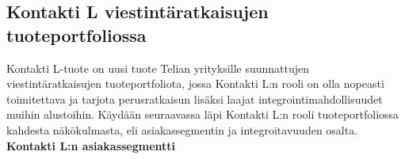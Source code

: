 \documentclass[finnish,12pt,a4paper,pdftex]{article}
\begin{document}






\subsection{Kontakti L viestintäratkaisujen tuoteportfoliossa}

Kontakti L-tuote on uusi tuote Telian yrityksille suunnattujen viestintäratkaisujen tuoteportfoliota, jossa Kontakti L:n rooli on olla nopeasti toimitettava ja tarjota perusratkaisun lisäksi laajat integrointimahdollisuudet muihin alustoihin. Käydään seuraavassa läpi Kontakti L:n rooli tuoteportfoliossa kahdesta näkökulmasta, eli asiakassegmentin ja integroitavuuden osalta.\\

\textbf{Kontakti L:n asiakassegmentti}\\
\end{document}
